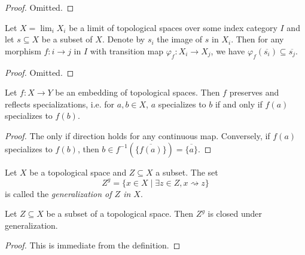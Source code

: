 \begin{proof}
  Omitted.
\end{proof}

\begin{lemma}
  \label{thm:closure-limit-compatible}
  Let $X = \lim_i X_i$ be a limit of topological spaces over some index category \(I\) and let
  $s \subseteq X$ be a subset of \(X\). Denote by $s_i$ the image of $s$ in $X_i$. Then for any morphism \(f : i \to j\) in \(I\) with transition map \(\varphi_{f} : X_i \to X_j\), we have \(\varphi_{f}(\overline{s_i}) \subseteq \overline{s_j}\).
  \leanok
\end{lemma}

\begin{proof}
  Omitted.
\end{proof}


\begin{lemma}
    Let $f\colon X \to Y$ be an embedding of topological spaces. Then $f$ preserves and reflects
    specializations, i.e. for $a, b \in X$, $a$ specializes to $b$ if and only if $f(a)$ specializes to $f(b)$.
    \label{lemma:embedding-specializations}
    \leanok
\end{lemma}

\begin{proof}
    \leanok
    The only if direction holds for any continuous map. Conversely, if $f(a)$ specializes to $f(b)$, then
    $b \in f^{-1}(\overline{\{f(a)\}}) = \overline{\{a\} }$.
\end{proof}

\begin{definition}
    Let $X$ be a topological space and $Z \subseteq X$ a subset. The set
    \[
    Z^g = \{ x \in X \mid \exists z \in Z, x \rightsquigarrow z \}
    \] is called the \emph{generalization of $Z$ in $X$}.
    \label{def:generalization}
    \leanok
\end{definition}

\begin{lemma}
    Let $Z \subseteq X$ be a subset of a topological space. Then $Z^g$ is closed under generalization.
    \label{lemma:generalization-stable-generalization}
    \leanok
\end{lemma}

\begin{proof}
    \leanok
    This is immediate from the definition.
\end{proof}

